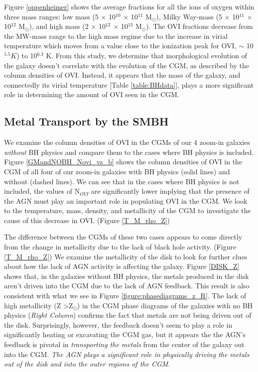 \documentclass[]{emulateapj}
\begin{document}
Figure \ref{oppenheimer} shows the average fractions for all the ions of oxygen within three mass ranges: low mass (5 $\times$ 10$^{10}$  $\times$ 10$^{11}$ M$_{\odot}$), Milky Way-mass (5 $\times$ 10$^{11}$  $\times$ 10$^{12}$ M$_{\odot}$), and high mass (2 $\times$ 10$^{12}$  $\times$ 10$^{13}$ M$_{\odot}$). The OVI fractions decrease from the MW-mass range to the high mass regime due to the increase in virial temperature which moves from a value close to the ionization peak for OVI, $\sim$ 10$^{5.5} K$) to 10$^{6.3}$ K. From this study, we determine that morphological evolution of the galaxy doesn't correlate with the evolution of the CGM, as described by the column densities of OVI. Instead, it appears that the mass of the galaxy, and connectedly its virial temperature [Table \ref{table:BHdata}], plays a more significant role in determining the amount of OVI seen in the CGM.


\subsection{Metal Transport by the SMBH}
\label{Result:metalsbyBH}

We examine the column densities of OVI in the CGMs of our 4 zoom-in galaxies \textit{without} BH physics and compare them to the cases where BH physics is included. Figure \ref{GMandNOBH_Novi_vs_b} shows the column densities of OVI in the CGM of all four of our zoom-in galaxies with BH physics (solid lines) and without (dashed lines). We can see that in the cases where BH physics is not included, the values of N$_{OVI}$ are significantly lower implying that the presence of the AGN must play an important role in populating OVI in the CGM. We look to the temperature, mass, density, and metallicity of the CGM to investigate the cause of this decrease in OVI. (Figure \ref{T_M_rho_Z})

The difference between the CGMs of these two cases appears to come directly from the change in metallicity due to the lack of black hole activity. (Figure \ref{T_M_rho_Z}) We examine the metallicity of the disk to look for further clues about how the lack of AGN activity is affecting the galaxy. Figure \ref{DISK_Z} shows that, in the galaxies without BH physics, the metals produced in the disk aren't driven into the CGM due to the lack of AGN feedback. This result is also consistent with what we see in Figure \ref{figure:phasediagrams_z_R}. The lack of high metallicity (Z \textgreater Z$_{\odot}$) in the CGM phase diagrams of the galaxies with no BH physics (\textit{Right Column}) confirms the fact that metals are not being driven out of the disk. Surprisingly, however, the feedback doesn't seem to play a role in significantly heating or excavating the CGM gas, but it appears the the AGN's feedback is pivotal in \textit{transporting the metals} from the center of the galaxy out into the CGM. \textit{The AGN plays a significant role in physically driving the metals out of the disk and into the outer regions of the CGM.}
\end{document}
